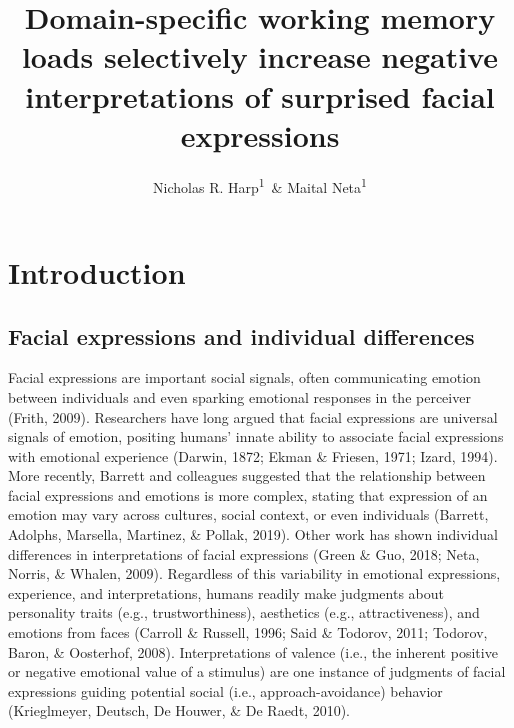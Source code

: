\documentclass[man]{apa6}
\title{Domain-specific working memory loads selectively increase negative interpretations of surprised facial expressions}
\author{Nicholas R. Harp\textsuperscript{1}~\& Maital Neta\textsuperscript{1}}
\date{}
\affiliation{
\vspace{0.5cm}
\textsuperscript{1} University of Nebraska-Lincoln}
\begin{document}
\maketitle

\hypertarget{introduction}{%
\section{Introduction}\label{introduction}}

\hypertarget{facial-expressions-and-individual-differences}{%
\subsection{Facial expressions and individual differences}\label{facial-expressions-and-individual-differences}}

Facial expressions are important social signals, often communicating emotion between individuals and even sparking emotional responses in the perceiver (Frith, 2009). Researchers have long argued that facial expressions are universal signals of emotion, positing humans' innate ability to associate facial expressions with emotional experience (Darwin, 1872; Ekman \& Friesen, 1971; Izard, 1994). More recently, Barrett and colleagues suggested that the relationship between facial expressions and emotions is more complex, stating that expression of an emotion may vary across cultures, social context, or even individuals (Barrett, Adolphs, Marsella, Martinez, \& Pollak, 2019). Other work has shown individual differences in interpretations of facial expressions (Green \& Guo, 2018; Neta, Norris, \& Whalen, 2009). Regardless of this variability in emotional expressions, experience, and interpretations, humans readily make judgments about personality traits (e.g., trustworthiness), aesthetics (e.g., attractiveness), and emotions from faces (Carroll \& Russell, 1996; Said \& Todorov, 2011; Todorov, Baron, \& Oosterhof, 2008). Interpretations of valence (i.e., the inherent positive or negative emotional value of a stimulus) are one instance of judgments of facial expressions guiding potential social (i.e., approach-avoidance) behavior (Krieglmeyer, Deutsch, De Houwer, \& De Raedt, 2010).
\end{document}
